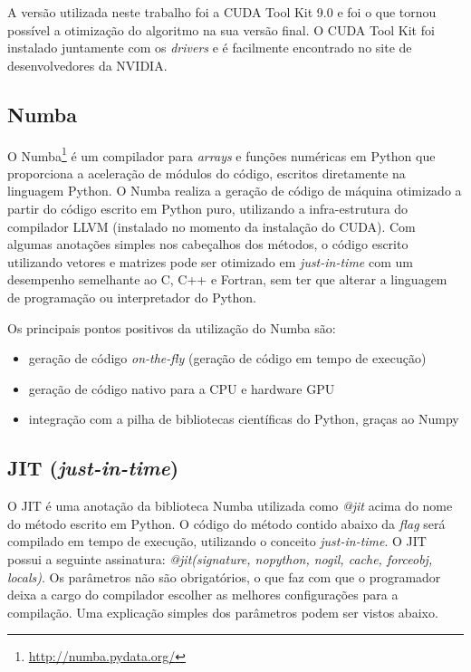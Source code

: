 \documentclass[
	12pt,				%
	openright,			%
	twoside,			%
	a4paper,			%
	english,			%
	french,				%
	spanish,			%
	brazil				%
	]{abntex2}
\begin{document}
A versão utilizada neste trabalho foi a CUDA Tool Kit 9.0 e foi o que tornou possível a otimização do algoritmo na sua versão final. O CUDA Tool Kit foi instalado juntamente com os \textit{drivers} e é facilmente encontrado no site de desenvolvedores da NVIDIA.


\subsection[Numba]{Numba}

O Numba\footnote{\url{http://numba.pydata.org/}} é um compilador para \textit{arrays} e funções numéricas em Python que proporciona a aceleração de módulos do código, escritos diretamente na linguagem Python. O Numba realiza a geração de código de máquina otimizado a partir do código escrito em Python puro, utilizando a infra-estrutura do compilador LLVM (instalado no momento da instalação do CUDA). Com algumas anotações simples nos cabeçalhos dos métodos, o código escrito utilizando vetores e matrizes pode ser otimizado em \textit{just-in-time} com um desempenho semelhante ao C, C++ e Fortran, sem ter que alterar a linguagem de programação ou interpretador do Python.

Os principais pontos positivos da utilização do Numba são:

\begin{itemize}
	\item geração de código \textit{on-the-fly} (geração de código em tempo de execução)
	\item geração de código nativo para a CPU e hardware GPU
	\item integração com a pilha de bibliotecas científicas do Python, graças ao Numpy
\end{itemize}


\subsection[JIT (just-in-time)]{JIT (\textit{just-in-time})}

O JIT é uma anotação da biblioteca Numba utilizada como \textit{@jit} acima do nome do método escrito em Python. O código do método contido abaixo da \textit{flag} será compilado em tempo de execução, utilizando o conceito \textit{just-in-time}. O JIT possui a seguinte assinatura: \textit{@jit(signature, nopython, nogil, cache, forceobj, locals)}. Os parâmetros não são obrigatórios, o que faz com que o programador deixa a cargo do compilador escolher as melhores configurações para a compilação. Uma explicação simples dos parâmetros podem ser vistos abaixo.
\end{document}
